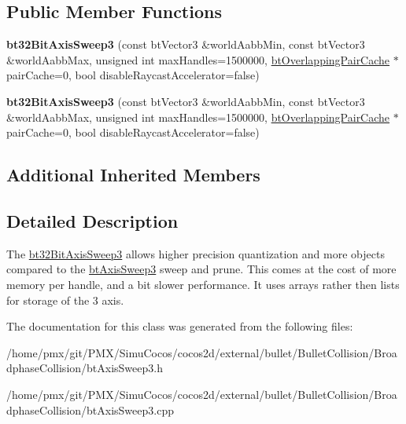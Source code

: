 \subsection*{Public Member Functions}
\begin{DoxyCompactItemize}
\item 
\mbox{\label{classbt32BitAxisSweep3_ae7ee848aa92265c338ae1bbe125f880d}} 
{\bfseries bt32\+Bit\+Axis\+Sweep3} (const bt\+Vector3 \&world\+Aabb\+Min, const bt\+Vector3 \&world\+Aabb\+Max, unsigned int max\+Handles=1500000, \hyperlink{classbtOverlappingPairCache}{bt\+Overlapping\+Pair\+Cache} $\ast$pair\+Cache=0, bool disable\+Raycast\+Accelerator=false)
\item 
\mbox{\label{classbt32BitAxisSweep3_ae7ee848aa92265c338ae1bbe125f880d}} 
{\bfseries bt32\+Bit\+Axis\+Sweep3} (const bt\+Vector3 \&world\+Aabb\+Min, const bt\+Vector3 \&world\+Aabb\+Max, unsigned int max\+Handles=1500000, \hyperlink{classbtOverlappingPairCache}{bt\+Overlapping\+Pair\+Cache} $\ast$pair\+Cache=0, bool disable\+Raycast\+Accelerator=false)
\end{DoxyCompactItemize}
\subsection*{Additional Inherited Members}


\subsection{Detailed Description}
The \hyperlink{classbt32BitAxisSweep3}{bt32\+Bit\+Axis\+Sweep3} allows higher precision quantization and more objects compared to the \hyperlink{classbtAxisSweep3}{bt\+Axis\+Sweep3} sweep and prune. This comes at the cost of more memory per handle, and a bit slower performance. It uses arrays rather then lists for storage of the 3 axis. 

The documentation for this class was generated from the following files\+:\begin{DoxyCompactItemize}
\item 
/home/pmx/git/\+P\+M\+X/\+Simu\+Cocos/cocos2d/external/bullet/\+Bullet\+Collision/\+Broadphase\+Collision/bt\+Axis\+Sweep3.\+h\item 
/home/pmx/git/\+P\+M\+X/\+Simu\+Cocos/cocos2d/external/bullet/\+Bullet\+Collision/\+Broadphase\+Collision/bt\+Axis\+Sweep3.\+cpp\end{DoxyCompactItemize}
